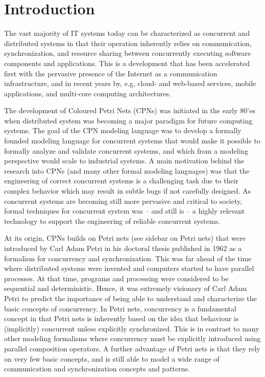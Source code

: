\section{Introduction}

The vast majority of IT systems today can be characterized as
concurrent and distributed systems in that their operation inherently
relies on communication, synchronization, and resource sharing between
concurrently executing software components and applications. This is a
development that has been accelerated first with the pervasive
presence of the Internet as a communication infrastructure, and in
recent years by, e.g, cloud- and web-based services, mobile
applications, and multi-core computing architectures.


The development of Coloured Petri Nets (CPNs) was initiated in the
early 80'es when distributed system was becoming a major paradigm for
future computing systems. The goal of the CPN modeling language was to
develop a formally founded modeling language for concurrent systems
that would make it possible to formally analyze and validate
concurrent systems, and which from a modeling perspective would scale
to industrial systems. A main motivation behind the research into CPNs
(and many other formal modeling languages) was that the engineering of
correct concurrent systems is a challenging task due to their complex
behavior which may result in subtle bugs if not carefully designed. As
concurrent systems are becoming still more pervasive and critical to
society, formal techniques for concurrent system was -- and still is
-- a highly relevant technology to support the engineering of reliable
concurrent systems.


At its origin, CPNs builds on Petri nets (see sidebar on Petri nets)
that were introduced by Carl Adam Petri in his doctoral thesis
published in 1962 \cite{capetri:thesis} as a formalism for concurrency
and synchronization. This was far ahead of the time where distributed
systems were invented and computers started to have parallel
processes. At that time, programs and processing were considered to be
sequential and deterministic. Hence, it was extremely visionary of
Carl Adam Petri to predict the importance of being able to understand
and characterize the basic concepts of concurrency. In Petri nets,
concurrency is a fundamental concept in that Petri nets is inherently
based on the idea that behaviour is (implicitly) concurrent unless
explicitly synchronized. This is in contrast to many other modeling
formalisms where concurrency must be explicitly introduced using
parallel composition operators. A further advantage of Petri nets is
that they rely on very few basic concepts, and is still able to model
a wide range of communication and synchronization concepts and
patterns.

